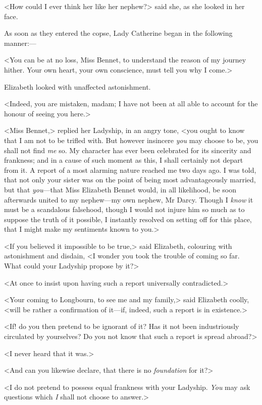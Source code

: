 <How could I ever think her like her nephew?> said she, as she looked in her face.

As soon as they entered the copse, Lady Catherine began in the following manner:—

<You can be at no loss, Miss Bennet, to understand the reason of my journey hither. Your own heart, your own conscience, must tell you why I come.>

Elizabeth looked with unaffected astonishment.

<Indeed, you are mistaken, madam; I have not been at all able to account for the honour of seeing you here.>

<Miss Bennet,> replied her Ladyship, in an angry tone, <you ought to know that I am not to be trifled with. But however insincere \textit{you} may choose to be, you shall not find \textit{me} so. My character has ever been celebrated for its sincerity and frankness; and in a cause of such moment as this, I shall certainly not depart from it. A report of a most alarming nature reached me two days ago. I was told, that not only your sister was on the point of being most advantageously married, but that \textit{you}—that Miss Elizabeth Bennet would, in all likelihood, be soon afterwards united to my nephew—my own nephew, Mr Darcy. Though I \textit{know} it must be a scandalous falsehood, though I would not injure him so much as to suppose the truth of it possible, I instantly resolved on setting off for this place, that I might make my sentiments known to you.>

<If you believed it impossible to be true,> said Elizabeth, colouring with astonishment and disdain, <I wonder you took the trouble of coming so far. What could your Ladyship propose by it?>

<At once to insist upon having such a report universally contradicted.>

<Your coming to Longbourn, to see me and my family,> said Elizabeth coolly, <will be rather a confirmation of it—if, indeed, such a report is in existence.>

<If! do you then pretend to be ignorant of it? Has it not been industriously circulated by yourselves? Do you not know that such a report is spread abroad?>

<I never heard that it was.>

<And can you likewise declare, that there is no \textit{foundation} for it?>

<I do not pretend to possess equal frankness with your Ladyship. \textit{You} may ask questions which \textit{I} shall not choose to answer.>

